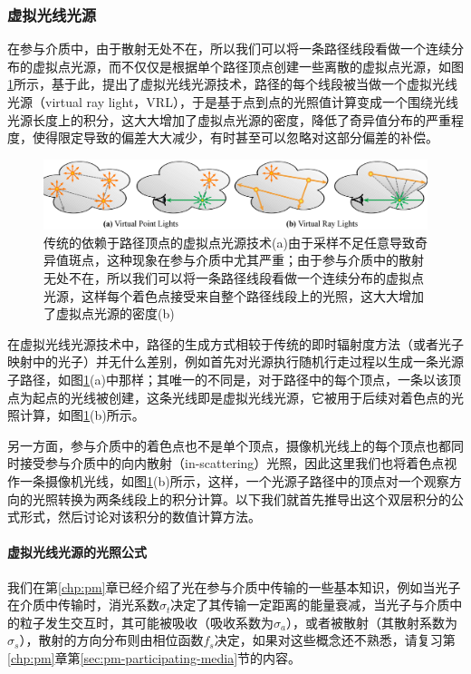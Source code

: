 \subsubsection{虚拟光线光源}\label{sec:ir-vrl}
在参与介质中，由于散射无处不在，所以我们可以将一条路径线段看做一个连续分布的虚拟点光源，而不仅仅是根据单个路径顶点创建一些离散的虚拟点光源，如图\ref{f:ir-vpl-vs-vrl}所示，基于此，\cite{a:VirtualRayLightsforRenderingSceneswithParticipatingMedia}提出了虚拟光线光源技术，路径的每个线段被当做一个虚拟光线光源（virtual ray light，VRL），于是基于点到点的光照值计算变成一个围绕光线光源长度上的积分，这大大增加了虚拟点光源的密度，降低了奇异值分布的严重程度，使得限定导致的偏差大大减少，有时甚至可以忽略对这部分偏差的补偿。

\begin{figure}
\begin{fullwidth}
	\includegraphics[width=1.\thewidth]{figures/ir/vpl-vs-vrl}
	\caption{传统的依赖于路径顶点的虚拟点光源技术(a)由于采样不足任意导致奇异值斑点，这种现象在参与介质中尤其严重；由于参与介质中的散射无处不在，所以我们可以将一条路径线段看做一个连续分布的虚拟点光源，这样每个着色点接受来自整个路径线段上的光照，这大大增加了虚拟点光源的密度(b)}
	\label{f:ir-vpl-vs-vrl}
\end{fullwidth}
\end{figure}

在虚拟光线光源技术中，路径的生成方式相较于传统的即时辐射度方法（或者光子映射中的光子）并无什么差别，例如首先对光源执行随机行走过程以生成一条光源子路径，如图\ref{f:ir-vpl-vs-vrl}(a)中那样；其唯一的不同是，对于路径中的每个顶点，一条以该顶点为起点的光线被创建，这条光线即是虚拟光线光源，它被用于后续对着色点的光照计算，如图\ref{f:ir-vpl-vs-vrl}(b)所示。

另一方面，参与介质中的着色点也不是单个顶点，摄像机光线上的每个顶点也都同时接受参与介质中的向内散射（in-scattering）光照，因此这里我们也将着色点视作一条摄像机光线，如图\ref{f:ir-vpl-vs-vrl}(b)所示，这样，一个光源子路径中的顶点对一个观察方向的光照转换为两条线段上的积分计算。以下我们就首先推导出这个双层积分的公式形式，然后讨论对该积分的数值计算方法。




\paragraph{虚拟光线光源的光照公式}
我们在第\ref{chp:pm}章已经介绍了光在参与介质中传输的一些基本知识，例如当光子在介质中传输时，消光系数$\sigma_t$决定了其传输一定距离的能量衰减，当光子与介质中的粒子发生交互时，其可能被吸收（吸收系数为$\sigma_a$），或者被散射（其散射系数为$\sigma_s$），散射的方向分布则由相位函数$f_s$决定，如果对这些概念还不熟悉，请复习第\ref{chp:pm}章第\ref{sec:pm-participating-media}节的内容。


